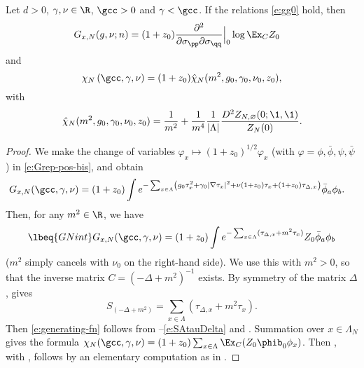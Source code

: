 \begin{prop}
\label{prop:intrep}
Let $d > 0$, $\gamma, \nu \in \R$, $\gcc >0$ and $\gamma <\gcc$.
If the relations \eqref{e:gg0} hold, then
\begin{align}
\label{e:generating-fn}
G_{x,N}(g, \nu; n)
	&=
(1+z_0)
\frac{\partial^2 }{\partial \sigma_\pp  \partial \sigma_\qq}\Big|_{0}
\log \Ex_C  Z_0
\end{align}
and
\begin{equation}
\label{e:chichibar}
  \chi_N\left(\gcc,\gamma,\nu\right)
  = (1+z_0)\hat\chi_N(m^2, g_0, \gamma_0, \nu_0, z_0)
  ,
\end{equation}
with
\begin{equation}
\label{e:chibarm}
\hat\chi_N(m^2, g_0, \gamma_0, \nu_0, z_0)
	=
\frac{1}{m^2}
	+
\frac{1}{m^4} \frac{1}{|\Lambda|} \frac{D^2 Z_{N,\varnothing}(0; \1, \1)}{Z_N(0)}.
\end{equation}
\end{prop}

\begin{proof}
We make the change of variables
$\varphi_x \mapsto (1 + z_0)^{1/2} \varphi_x$ (with $\varphi = \phi, \bar\phi, \psi, \bar\psi$)
in \eqref{e:Grep-pos-bis}, and obtain
\begin{align}
    G_{x,N}(\gcc,\gamma,\nu)
    &=  (1+z_0)
    \int
    e^{-\sum_{x\in\Lambda}
    \left(
    g_0 \tau_x^2 + \gamma_0 |\nabla \tau_x|^2
    + \nu (1+z_0) \tau_x + (1+z_0)\tau_{\Delta,x}\right)} \bar\phi_a \phi_b
    .
    \label{e:Grep-pos}
\end{align}
Then, for any $m^2 \in\R$, we have
\begin{equation}
\lbeq{GNint}
G_{x,N}(\gcc,\gamma,\nu)
    =
(1 + z_0) \int
e^{-\sum_{x\in\Lambda} (\tau_{\Delta,x} + m^2 \tau_x)}
Z_0 \bar\phi_a \phi_b
\end{equation}
($m^2$ simply cancels with $\nu_0$ on the right-hand side).
We use this with $m^2>0$, so that the inverse matrix $C=(-\Delta+m^2)^{-1}$ exists.
By symmetry of the matrix $\Delta$,  gives
\begin{equation}
\label{e:SAtauDelta}
S_{(-\Delta+m^2)}
=
\sum_{x\in\Lambda} \left( \tau_{\Delta,x}
+ m^2  \tau_x \right).
\end{equation}
Then \eqref{e:generating-fn} follows from --\eqref{e:SAtauDelta} and .  Summation
over $x\in \Lambda_N$ gives the formula $\chi_N(\gcc,\gamma,\nu) = (1+z_0)\sum_{x\in \Lambda} \Ex_C
(Z_0\phib_0\phi_x)$.  Then , with , follows
by an elementary computation as in \cite[Section~\ref{log-sec:ga}]{BBS-saw4-log}.
\end{proof}

